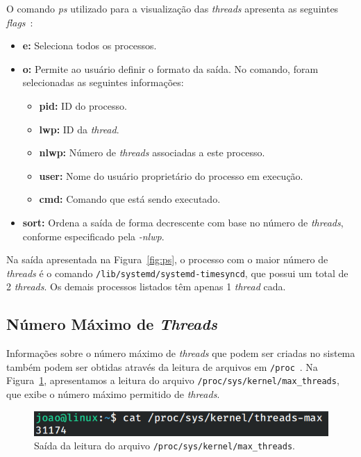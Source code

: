 \documentclass[
	12pt,				%
	oneside,   	        %
	a4paper,			%
	english,			%
	french,				%
	spanish,			%
	brazil,				%
	]{pacotes/abntex2}
\begin{document}
O comando \textit{ps} utilizado para a visualização das \textit{threads} apresenta as seguintes \textit{flags}~\cite{shotts2017}:

\begin{itemize}
    \item \textbf{e:} Seleciona todos os processos.
    \item \textbf{o:} Permite ao usuário definir o formato da saída. No comando, foram selecionadas as seguintes informações:
    \begin{itemize}
        \item \textbf{pid:} ID do processo.
        \item \textbf{lwp:} ID da \textit{thread}.
        \item \textbf{nlwp:} Número de \textit{threads} associadas a este processo.
        \item \textbf{user:} Nome do usuário proprietário do processo em execução.
        \item \textbf{cmd:} Comando que está sendo executado.
    \end{itemize}
    \item \textbf{sort:} Ordena a saída de forma decrescente com base no número de \textit{threads}, conforme especificado pela \textit{-nlwp}.
\end{itemize}

Na saída apresentada na Figura~\ref{fig:ps}, o processo com o maior número de \textit{threads} é o comando \texttt{/lib/systemd/systemd-timesyncd}, que possui um total de 2 \textit{threads}. Os demais processos listados têm apenas 1 \textit{thread} cada.

\subsection{Número Máximo de \textit{Threads}}
\label{subsec:max_threads}

Informações sobre o número máximo de \textit{threads} que podem ser criadas no sistema também podem ser obtidas através da leitura de arquivos em \texttt{/proc}~\cite{negus2012}. Na Figura~\ref{fig:max_threads}, apresentamos a leitura do arquivo \texttt{/proc/sys/kernel/max\_threads}, que exibe o número máximo permitido de \textit{threads}.

\begin{figure}[H]
  \centering
  \includegraphics[scale=0.45]{figuras/max_threads.png}
  \caption{Saída da leitura do arquivo \texttt{/proc/sys/kernel/max\_threads}.}
  \label{fig:max_threads}
\end{figure}
\end{document}
